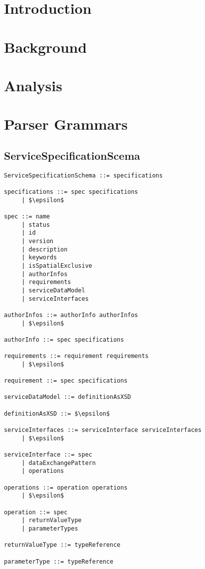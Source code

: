 \documentclass[a4paper]{article}
\begin{document}


\tableofcontents

\newpage

\section{Introduction}

\section{Background}

\section{Analysis}

\section{Parser Grammars}

\subsection{ServiceSpecificationScema}
\begin{lstlisting}[mathescape=true]
ServiceSpecificationSchema ::= specifications

specifications ::= spec specifications
     | $\epsilon$
     
spec ::= name
     | status
     | id
     | version
     | description
     | keywords
     | isSpatialExclusive
     | authorInfos
     | requirements
     | serviceDataModel
     | serviceInterfaces
     
authorInfos ::= authorInfo authorInfos
     | $\epsilon$

authorInfo ::= spec specifications

requirements ::= requirement requirements
     | $\epsilon$

requirement ::= spec specifications

serviceDataModel ::= definitionAsXSD

definitionAsXSD ::= $\epsilon$

serviceInterfaces ::= serviceInterface serviceInterfaces
     | $\epsilon$

serviceInterface ::= spec
     | dataExchangePattern
     | operations

operations ::= operation operations
     | $\epsilon$

operation ::= spec
     | returnValueType
     | parameterTypes

returnValueType ::= typeReference

parameterType ::= typeReference

\end{lstlisting}
\end{document}
